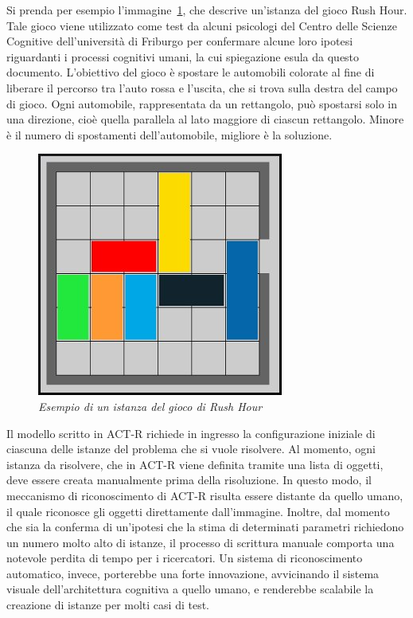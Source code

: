 		Si prenda per esempio l'immagine~\ref{fig:RushHourHumanIta}, che descrive un'istanza del gioco Rush Hour.
		Tale gioco viene utilizzato come test da alcuni psicologi del Centro delle Scienze Cognitive dell'università di Friburgo per confermare alcune loro ipotesi riguardanti i processi cognitivi umani, la cui spiegazione esula da questo documento.
		L'obiettivo del gioco è spostare le automobili colorate al fine di liberare il percorso tra l'auto rossa e l'uscita, che si trova sulla destra del campo di gioco.
		Ogni automobile, rappresentata da un rettangolo, può spostarsi solo in una direzione, cioè quella parallela al lato maggiore di ciascun rettangolo.
		Minore è il numero di spostamenti dell'automobile, migliore è la soluzione. 	

		\begin{figure}[!h]
		  \begin{center} 
			 \includegraphics[scale=0.6]{images/ch_03/originale.jpg}	
		  \end{center} 
		  \caption{\textit{Esempio di un istanza del gioco di Rush Hour}}
		  \label{fig:RushHourHumanIta}	
	  	\end{figure}

		Il modello scritto in \mbox{ACT-R} richiede in ingresso la configurazione iniziale di ciascuna delle istanze del problema che si vuole risolvere.
		Al momento, ogni istanza da risolvere, che in \mbox{ACT-R} viene definita tramite una lista di oggetti, deve essere creata manualmente prima della risoluzione. 
		In questo modo, il meccanismo di riconoscimento di \mbox{ACT-R} risulta essere distante da quello umano, il quale riconosce gli oggetti direttamente dall'immagine. 
		Inoltre, dal momento che sia la conferma di un'ipotesi che la stima di determinati parametri richiedono un numero molto alto di istanze, il processo di scrittura manuale comporta una notevole perdita di tempo per i ricercatori.
		Un sistema di riconoscimento automatico, invece, porterebbe una forte innovazione, avvicinando il sistema visuale dell'architettura cognitiva a quello umano, e renderebbe scalabile la creazione di istanze per molti casi di test.
		
